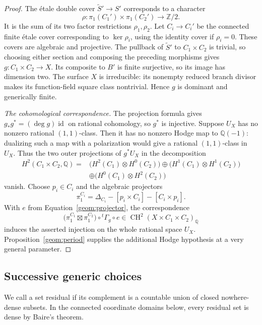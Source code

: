 \documentclass[11pt]{amsart}
\newcommand{\Q}{\mathbb Q}
\newcommand{\Z}{\mathbb Z}
\DeclareMathOperator{\CH}{CH}
\DeclareMathOperator{\id}{id}
\theoremstyle{definition}
\theoremstyle{remark}
\numberwithin{equation}{section}
\begin{document}
\begin{proof}
The \'{e}tale double cover $\widetilde S'\to S'$ corresponds to a
character
\[
 \rho:\pi_1(C_1')\times\pi_1(C_2')\longrightarrow\Z/2.
\]
It is the sum of its two factor restrictions $\rho_1,\rho_2$.
Let $C_i\to C_i'$ be the connected finite \'{e}tale cover
corresponding to $\ker\rho_i$, using the identity cover if
$\rho_i=0$.  These covers are algebraic and projective.  The
pullback of $\widetilde S'$ to $C_1\times C_2$ is trivial, so
choosing either section and composing the preceding morphisms gives
$g:C_1\times C_2\to X$.  Its composite to $B'$ is finite
surjective, so its image has dimension two.  The surface $X$ is
irreducible: its nonempty reduced branch divisor makes its
function-field square class nontrivial.  Hence $g$ is dominant and
generically finite.

\smallskip\noindent
\emph{The cohomological correspondence.}
The projection formula gives $g_*g^*=(\deg g)\id$ on rational
cohomology, so $g^*$ is injective.  Suppose $U_X$ has no nonzero
rational $(1,1)$-class.  Then it has no nonzero Hodge map to
$\Q(-1)$: dualizing such a map with a polarization would give a
rational $(1,1)$-class in $U_X$.  Thus the two outer projections of
$g^*U_X$ in the decomposition
\[
 \begin{split}
 H^2(C_1\times C_2,\Q)={}&
 \bigl(H^2(C_1)\otimes H^0(C_2)\bigr)
 \oplus\bigl(H^1(C_1)\otimes H^1(C_2)\bigr)\\
 &\oplus\bigl(H^0(C_1)\otimes H^2(C_2)\bigr)
 \end{split}
\]
vanish.  Choose $p_i\in C_i$ and the algebraic projectors
\[
 \pi_1^{C_i}=\Delta_{C_i}-[p_i\times C_i]-[C_i\times p_i].
\]
With $e$ from Equation~\eqref{geom:projector}, the correspondence
\[
 \bigl(\pi_1^{C_1}\boxtimes\pi_1^{C_2}\bigr)
       \circ{}^t\Gamma_g\circ e
 \in\CH^2(X\times C_1\times C_2)_\Q
\]
induces the asserted injection on the whole rational space $U_X$.
Proposition~\ref{geom:period} supplies the additional Hodge
hypothesis at a very general parameter.
\end{proof}

\subsection{Successive generic choices}

We call a set residual if its complement is a countable union of
closed nowhere-dense subsets.  In the connected coordinate domains
below, every residual set is dense by Baire's theorem.
\end{document}
